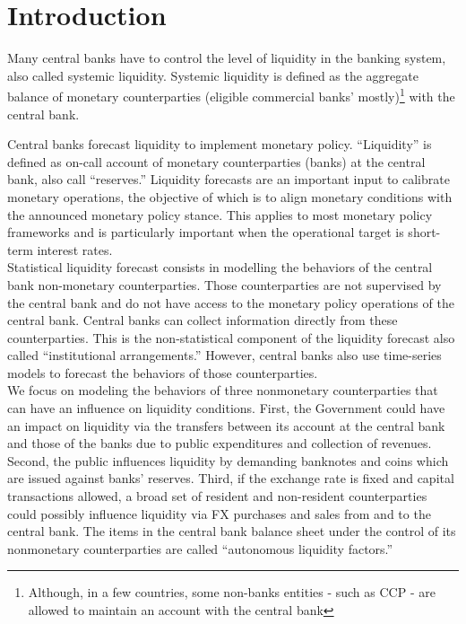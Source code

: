 \section{Introduction}

Many  central banks  have to  control the  level of  liquidity in  the banking
system, also called systemic liquidity.   Systemic liquidity is defined as the
aggregate  balance  of  monetary counterparties  (eligible  commercial  banks'
mostly)\footnote{Although, in a few countries,  some non-banks entities - such
as CCP -  are allowed to maintain  an account with the central  bank} with the
central bank.

Central banks forecast liquidity to  implement monetary policy. “Liquidity” is
defined as on-call  account of monetary counterparties (banks)  at the central
bank,  also call  “reserves.” Liquidity  forecasts are  an important  input to
calibrate monetary  operations, the  objective of which  is to  align monetary
conditions with  the announced  monetary policy stance.  This applies  to most
monetary policy frameworks and is  particularly important when the operational
target is short-term interest rates.\\

Statistical  liquidity forecast  consists in  modelling the  behaviors of  the
central  bank  non-monetary  counterparties.   Those  counterparties  are  not
supervised by the central  bank and do not have access  to the monetary policy
operations of the central bank. Central banks can collect information directly
from  these  counterparties. This  is  the  non-statistical component  of  the
liquidity forecast also called “institutional arrangements.”  However, central
banks  also  use  time-series  models  to  forecast  the  behaviors  of  those
counterparties.\\

We focus  on modeling the  behaviors of three nonmonetary  counterparties that
can have  an influence  on liquidity conditions.  First, the  Government could
have  an impact  on liquidity  via the  transfers between  its account  at the
central bank and those of the  banks due to public expenditures and collection
of revenues.  Second, the public  influences liquidity by  demanding banknotes
and coins  which are issued  against banks’  reserves. Third, if  the exchange
rate is  fixed and capital transactions  allowed, a broad set  of resident and
non-resident  counterparties   could  possibly  influence  liquidity   via  FX
purchases and  sales from and  to the central bank.  The items in  the central
bank balance  sheet under  the control of  its nonmonetary  counterparties are
called “autonomous liquidity factors.”

